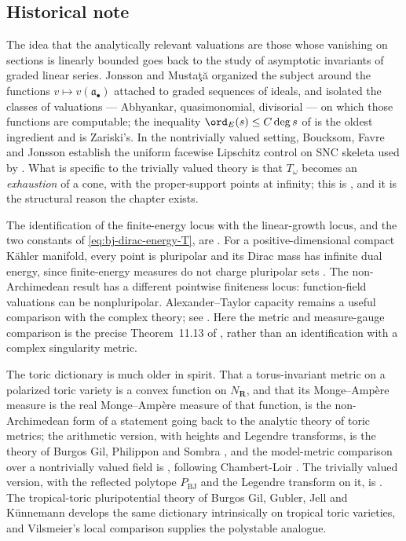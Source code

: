 \subsection{Historical note}
\label{sec:ch49-history}

The idea that the analytically relevant valuations are those whose
vanishing on sections is linearly bounded goes back to the study of
asymptotic invariants of graded linear series.  Jonsson and Musta\c{t}\u{a}
\cite{JM12} organized the subject around the functions
$v\mapsto v(\mathfrak a_\bullet)$ attached to graded sequences of
ideals, and isolated the classes of valuations --- Abhyankar,
quasimonomial, divisorial --- on which those functions are computable; the
inequality $\ord_E(s)\le C\deg s$ of
 is the oldest ingredient and is
Zariski's.  In the nontrivially valued setting, Boucksom, Favre and
Jonsson \cite[Theorem~6.1]{BFJ16} establish the uniform facewise
Lipschitz control on SNC skeleta used by \cite[Theorem~A.4]{BJ22}.
What is specific to the trivially valued theory is
that $T_\omega$ becomes an \emph{exhaustion} of a cone, with the
proper-support points at infinity; this is
\cite[\S1.5]{BJ22}, and it is the structural reason the chapter exists.

The identification of the finite-energy locus with the linear-growth locus,
and the two constants of \eqref{eq:bj-dirac-energy-T}, are
\cite[\S11]{BJ22}.  For a positive-dimensional compact Kähler manifold, every point
is pluripolar and its Dirac mass has infinite dual energy, since
finite-energy measures do not charge pluripolar sets \cite{GZ07}.
The non-Archimedean result has a different pointwise finiteness locus:
function-field valuations can be nonpluripolar.
Alexander--Taylor capacity remains a useful comparison with the
complex theory; see .
Here the metric and measure-gauge comparison is the precise
Theorem~11.13 of \cite{BJ22}, rather than an identification with a
complex singularity metric.

The toric dictionary is much older in spirit.  That a torus-invariant
metric on a polarized toric variety is a convex function on
$N_{\mathbf R}$, and that its Monge--Amp\`ere measure is the real
Monge--Amp\`ere measure of that function, is the non-Archimedean form of a
statement going back to the analytic theory of toric metrics; the
arithmetic version, with heights and Legendre transforms, is the theory of
Burgos Gil, Philippon and Sombra \cite{BGPS14}, and the model-metric
comparison over a nontrivially valued field is
, following Chambert-Loir \cite{CL06}.  The
trivially valued version, with the reflected polytope $P_{\mathrm{BJ}}$
and the Legendre transform on it, is \cite[Appendix~B]{BJ22}.  The
tropical-toric pluripotential theory of Burgos Gil, Gubler, Jell and
K\"unnemann \cite{BGJKK25} develops the same dictionary intrinsically on
tropical toric varieties, and Vilsmeier's local comparison \cite{Vil20}
supplies the polystable analogue.

